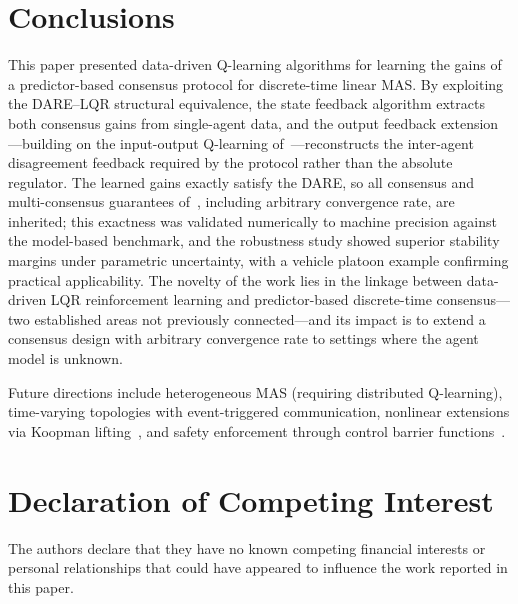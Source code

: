 \documentclass[12pt]{elsarticle}
\theoremstyle{remark}
\begin{document}
\section{Conclusions}
\label{sec:conc}

This paper presented data-driven Q-learning algorithms for learning the gains of a predictor-based consensus protocol for discrete-time linear MAS. By exploiting the DARE--LQR structural equivalence, the state feedback algorithm extracts both consensus gains from single-agent data, and the output feedback extension---building on the input-output Q-learning of~\cite{rizvi2022}---reconstructs the inter-agent disagreement feedback required by the protocol rather than the absolute regulator. The learned gains exactly satisfy the DARE, so all consensus and multi-consensus guarantees of~\cite{cacace2024}, including arbitrary convergence rate, are inherited; this exactness was validated numerically to machine precision against the model-based benchmark, and the robustness study showed superior stability margins under parametric uncertainty, with a vehicle platoon example confirming practical applicability. The novelty of the work lies in the linkage between data-driven LQR reinforcement learning and predictor-based discrete-time consensus---two established areas not previously connected---and its impact is to extend a consensus design with arbitrary convergence rate to settings where the agent model is unknown.

Future directions include heterogeneous MAS (requiring distributed Q-learning), time-varying topologies with event-triggered communication, nonlinear extensions via Koopman lifting~\cite{dony2024koopman}, and safety enforcement through control barrier functions~\cite{dony2025debf}.

\section*{Declaration of Competing Interest}

The authors declare that they have no known competing financial interests or personal relationships that could have appeared to influence the work reported in this paper.

\end{document}
